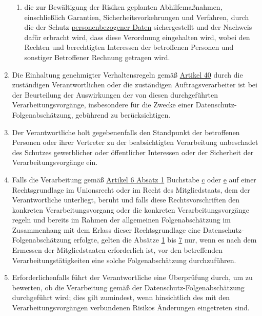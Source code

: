 \begin{enumerate}
\begin{enumerate}
    \item die zur Bewältigung der Risiken geplanten Abhilfemaßnahmen, einschließlich Garantien, Sicherheitsvorkehrungen
     und Verfahren, durch die der Schutz \hyperref[itm:04-1]{personenbezogener Daten} sichergestellt und der Nachweis dafür erbracht wird,
     dass diese Verordnung eingehalten wird, wobei den Rechten und berechtigten Interessen der betroffenen Personen und
     sonstiger Betroffener Rechnung getragen wird.
    \label{itm:35-7d}

  \end{enumerate}

  \item Die Einhaltung genehmigter Verhaltensregeln gemäß \hyperref[ch:40]{Artikel 40} durch die zuständigen
   Verantwortlichen oder die zuständigen Auftragsverarbeiter ist bei der Beurteilung der Auswirkungen der von diesen
   durchgeführten Verarbeitungsvorgänge, insbesondere für die Zwecke einer Datenschutz-Folgenabschätzung, gebührend zu
   berücksichtigen.
  \label{itm:35-8}

  \item Der Verantwortliche holt gegebenenfalls den Standpunkt der betroffenen Personen oder ihrer Vertreter zu der
   beabsichtigten Verarbeitung unbeschadet des Schutzes gewerblicher oder öffentlicher Interessen oder der Sicherheit
   der Verarbeitungsvorgänge ein.
  \label{itm:35-9}

  \item Falls die Verarbeitung gemäß \hyperref[itm:06-1]{Artikel 6 Absatz 1} Buchstabe \hyperref[itm:06-1c]
   {c} oder \hyperref[itm:06-1e]{e} auf einer Rechtsgrundlage im Unionsrecht oder im Recht des Mitgliedstaats, dem der
   Verantwortliche unterliegt, beruht und falls diese Rechtsvorschriften den konkreten Verarbeitungsvorgang oder die
   konkreten Verarbeitungsvorgänge regeln und bereits im Rahmen der allgemeinen Folgenabschätzung im Zusammenhang mit
   dem Erlass dieser Rechtsgrundlage eine Datenschutz-Folgenabschätzung erfolgte, gelten die Absätze \hyperref
   [itm:35-1]{1} bis \hyperref[itm:35-7]{7} nur, wenn es nach dem Ermessen der Mitgliedstaaten erforderlich ist, vor
   den betreffenden Verarbeitungstätigkeiten eine solche Folgenabschätzung durchzuführen.
  \label{itm:35-10}

  \item Erforderlichenfalls führt der Verantwortliche eine Überprüfung durch, um zu bewerten, ob die Verarbeitung gemäß
   der Datenschutz-Folgenabschätzung durchgeführt wird; dies gilt zumindest, wenn hinsichtlich des mit den
   Verarbeitungsvorgängen verbundenen Risikos Änderungen eingetreten sind.
  \label{itm:35-11}

\end{enumerate}


